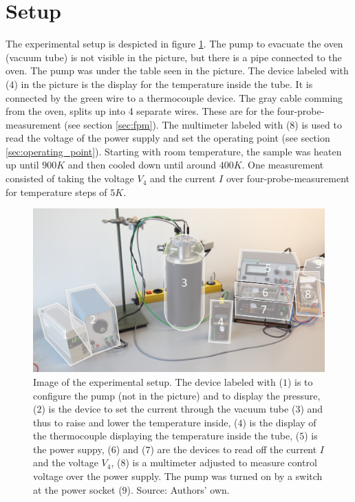 \documentclass[a4paper]{article}
\begin{document}
\section{Setup}

The experimental setup is despicted in figure \ref{fig:setup}. The pump to evacuate the oven (vacuum tube) is not visible in the picture, but there is a pipe connected to the oven. The pump was under the table seen in the picture. The device labeled with ($4$) in the picture is the display for the temperature inside the tube. It is connected by the green wire to a thermocouple device. The gray cable comming from the oven, splits up into 4 separate wires. These are for the four-probe-measurement (see section \ref{sec:fpm}). The multimeter labeled with ($8$) is used to read the voltage of the power supply and set the operating point (see section \ref{sec:operating_point}). Starting with room temperature, the sample was heaten up until $900 K$ and then cooled down until around $400 K$. One measurement consisted of taking the voltage $V_4$ and the current $I$ over four-probe-measurement for temperature steps of $5 K$.

\begin{figure}[H]
\captionsetup{singlelinecheck=off}
\centering
\includegraphics[width=1.0\textwidth]{img/setup.jpg}
\caption[blubb]{Image of the experimental setup. The device labeled with ($1$) is to configure the pump (not in the picture) and to display the pressure, ($2$) is the device to set the current through the vacuum tube ($3$) and thus to raise and lower the temperature inside, ($4$) is the display of the thermocouple displaying the temperature inside the tube, ($5$) is the power suppy, ($6$) and ($7$) are the devices to read off the current $I$ and the voltage $V_4$, ($8$) is a multimeter adjusted to measure control voltage over the power supply. The pump was turned on by a switch at the power socket ($9$). Source: Authors' own.}
\label{fig:setup}
\end{figure}
\end{document}
